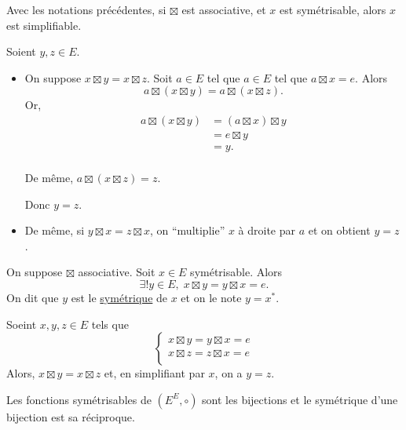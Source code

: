 \begin{prop}
	Avec les notations précédentes, si $\boxtimes$ est associative, et $x$ est symétrisable, alors $x$ est simplifiable.
\end{prop}

\begin{prv}
	Soient $y, z \in E$.
	\begin{itemize}
		\item On suppose $x \boxtimes y = x \boxtimes z$. Soit $a \in E$ tel que $a\in E$ tel que $a \boxtimes x = e$. Alors \[
				a \boxtimes (x\boxtimes y) = a \boxtimes (x \boxtimes z).
			\] Or,
			\begin{align*}
				a \boxtimes (x \boxtimes y) &= (a \boxtimes x) \boxtimes y \\
				&= e \boxtimes y \\
				&= y. \\
			\end{align*}

			De même, $a \boxtimes (x \boxtimes z) = z$.

			Donc $y = z$.
		\item De même, si $y \boxtimes x = z \boxtimes x$, on ``multiplie'' $x$ à droite par $a$ et on obtient $y = z$.
	\end{itemize}
\end{prv}

\begin{prop-defn}
	On suppose $\boxtimes$ associative. Soit $x \in E$ symétrisable. Alors \[
		\exists ! y \in E,\; x \boxtimes y = y \boxtimes x = e.
	\] On dit que $y$ est le \underline{symétrique} de $x$ et on le note $y = x^*$.
\end{prop-defn}

\begin{prv}
	Soeint $x,y,z \in E$ tels que \[
		\begin{cases}
			 x \boxtimes y = y \boxtimes x = e\\
			 x \boxtimes z = z \boxtimes x = e\\
		\end{cases}
	\] Alors, $x \boxtimes y = x \boxtimes z$ et, en simplifiant par $x$, on a $y = z$.
\end{prv}

\begin{exm}
	Les fonctions symétrisables de $(E^E,  \circ)$ sont les bijections et le symétrique d'une bijection est sa réciproque.
\end{exm}

